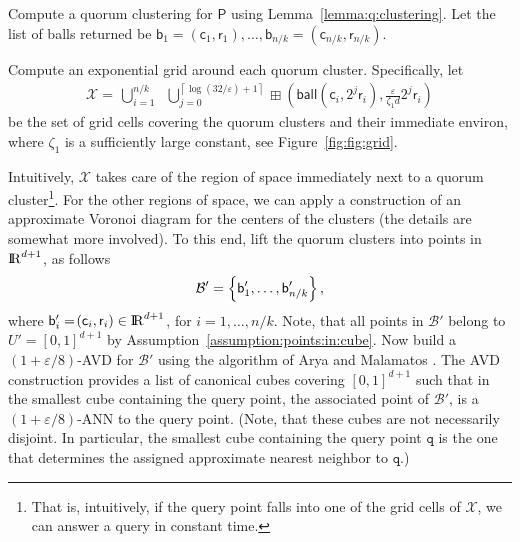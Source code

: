 \documentclass[12pt]{article}
\makeatletter
\newcommand{\assumpref}[1]{Assumption~\ref{assumption:#1}}
\providecommand{\lemref}[1]{Lemma~\ref{lemma:#1}}
\newcommand{\figref}[1]{Figure~\ref{fig:#1}}
\newcommand{\Term}[1]{\textsf{#1}}
\newcommand{\TermI}[1]{\Term{#1}\index{#1@\Term{#1}}}
\theoremstyle{remark}{\theorembodyfont{\rm} \newtheorem{remark}[theorem]{Remark}}
\newcommand{\eqlab}[1]{\label{equation:#1}}
\newcommand{\pth}[2][\!]{#1\left({#2}\right)}
\newcommand{\ceiling}[1]{\left \lceil {#1} \right \rceil}
\newcommand{\eps}{{\varepsilon}}\newcommand{\divides}{|}
\newcommand{\ANN}{\TermI{ANN}\xspace}
\newcommand{\AVD}{\TermI{AVD}\xspace}
\renewcommand{\Re}{{\rm I\!\hspace{-0.025em} R}}
\newcommand{\PntSet}{\mathsf{P}}
\newcommand{\query}{\mathtt{q}}
\newcommand{\ballA}{\mathsf{b}}
\newcommand{\BallSet}{\mathcal{B}}
\newcommand{\ctrA}{\mathsf{c}}
\newcommand{\radA}{\mathsf{r}}
\newcommand{\CellSetA}{\mathcal{X}}
\newcommand{\Scube}{U}
\newcommand{\mapped}[1]{#1'}
\newcommand{\ball}[2]{\mathsf{ball}\pth{#1,#2}}
\newcommand{\gridSet}[2]{\boxplus\pth{#1, #2}}
\newcommand{\ds}{\displaystyle}
\newcommand{\constA}{\zeta_1}
\newlength{\savedparindent}
\newcommand{\SaveIndent}{\setlength{\savedparindent}{\parindent}}
\newcommand{\RestoreIndent}{\setlength{\parindent}{\savedparindent}}
\makeatother
\begin{document}
\SaveIndent
\begin{compactenum}[(A)]
    \RestoreIndent
    \item Compute a quorum clustering for $\PntSet$ using
    \lemref{q:clustering}. Let the list of balls returned be $\ballA_1
    = \pth{\ctrA_1,\radA_1}, \dots, \ballA_{n/k} =
    \pth{\ctrA_{n/k},\radA_{n/k}}$.
    
    \item Compute an exponential grid around each quorum
    cluster. Specifically, let
    \begin{align}
        \ds \CellSetA =\, \bigcup_{i = 1}^{n/k} \;\;\bigcup_{j =0}^{
           \ceiling{\log\pth[]{32/\eps} + 1}}
        \gridSet{\ball{\ctrA_i}{2^j \radA_i} }{ \frac{\eps}{\constA d}
           2^j \radA_i }\eqlab{clusters:around:q}
    \end{align}
    be the set of grid cells covering the quorum clusters and their
    immediate environ, where $\constA$ is a sufficiently large
    constant, see \figref{fig:grid}.
    
\item Intuitively, $\CellSetA$ takes care of the region of space
    immediately next to a quorum cluster\footnote{That is, intuitively, if the query point falls into one
       of the grid cells of $\CellSetA$, we can answer a query in
       constant time.}.  For the other regions of space, we can apply
    a construction of an approximate Voronoi diagram for
    the centers of the clusters (the details are somewhat more
    involved). To this end, lift the quorum clusters into points in
    $\Re^{d+1}$, as follows
    \begin{align*}
        \mapped{\BallSet} = \brc{\mapped{\ballA_1}, \dots,
           \mapped{\ballA_{n/k}}},
    \end{align*}
    where $\mapped{\ballA_i} = \pth{\ctrA_i,\radA_i} \in \Re^{d+1}$,
    for $i=1,\ldots, n/k$.  Note, that all points in
    $\mapped{\BallSet}$ belong to $\mapped{\Scube} = [0,1]^{d+1}$ by
    \assumpref{points:in:cube}.  Now build a $(1+\eps/8)$-\AVD for
    $\mapped{\BallSet}$ using the algorithm of Arya and Malamatos
    \cite{am-lsavd-02}. The \AVD construction provides a list of
    canonical cubes covering $[0,1]^{d+1}$ such that in the smallest
    cube containing the query point, the associated point of
    $\mapped{\BallSet}$, is a $(1+\eps/8)$-\ANN to the query
    point. (Note, that these cubes are not necessarily disjoint. In
    particular, the smallest cube containing the query point $\query$
    is the one that determines the assigned approximate nearest
    neighbor to $\query$.)
    

\end{compactenum}
\end{document}
